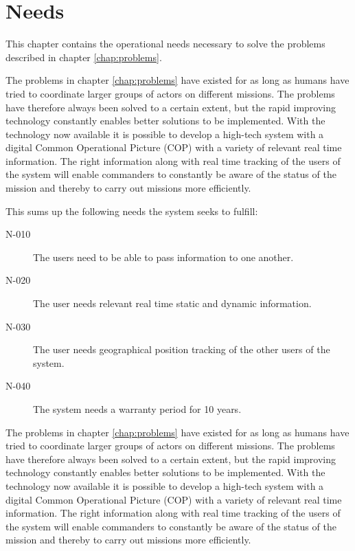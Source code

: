 \chapter{Needs}
This chapter contains the operational needs necessary to solve the problems described in chapter \ref{chap:problems}. 

The problems in chapter \ref{chap:problems} have existed for as long as humans have tried to coordinate larger groups of actors on different missions. The problems have therefore always been solved to a certain extent, but the rapid improving technology constantly enables better solutions to be implemented. With the technology now available it is possible to develop a high-tech system with a digital Common Operational Picture (COP) with a variety of relevant real time information. The right information along with real time tracking of the users of the system will enable commanders to constantly be aware of the status of the mission and thereby to carry out missions more efficiently. 

This sums up the following needs the system seeks to fulfill:

\begin{description}
\item[N-010] The users need to be able to pass information to one another. 
\item[N-020] The user needs relevant real time static and dynamic information. 
\item[N-030] The user needs geographical position tracking of the other users of the system.
\item[N-040] The system needs a warranty period for 10 years. 
\end{description}
	
	







The problems in chapter \ref{chap:problems} have existed for as long as humans have tried to coordinate larger groups of actors on different missions. The problems have therefore always been solved to a certain extent, but the rapid improving technology constantly enables better solutions to be implemented. With the technology now available it is possible to develop a high-tech system with a digital Common Operational Picture (COP) with a variety of relevant real time information. The right information along with real time tracking of the users of the system will enable commanders to constantly be aware of the status of the mission and thereby to carry out missions more efficiently. 

